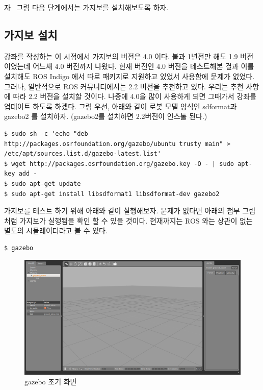 \noindent
자~ 그럼 다음 단계에서는 가지보를 설치해보도록 하자.

\subsection{가지보 설치}

강좌를 작성하는 이 시점에서 가지보의 버전은 4.0 이다. 불과 1년전만 해도 1.9 버전 이였는데 어느새 4.0 버전까지 나왔다. 현재 버전인 4.0 버전을 테스트해본 결과 이를 설치해도 ROS Indigo 에서 따로 패키지로 지원하고 있었서 사용함에 문제가 없었다. 그러나, 일반적으로 ROS 커뮤니티에서는 2.2 버전을 추천하고 있다. 우리는 추천 사항에 따라 2.2 버전을 설치할 것이다. 나중에 4.0을 많이 사용하게 되면 그때가서 강좌를 업데이트 하도록 하겠다. 그럼 우선, 아래와 같이 로봇 모델 양식인 sdformat과 gazebo2 를 설치하자. (gazebo2를 설치하면 2.2버전이 인스톨 된다.)

\vspace{\baselineskip}
\begin{lstlisting}[language=ROS]
$ sudo sh -c 'echo "deb http://packages.osrfoundation.org/gazebo/ubuntu trusty main" > /etc/apt/sources.list.d/gazebo-latest.list'
$ wget http://packages.osrfoundation.org/gazebo.key -O - | sudo apt-key add -
$ sudo apt-get update
$ sudo apt-get install libsdformat1 libsdformat-dev gazebo2 
\end{lstlisting}

가지보를 테스트 하기 위해 아래와 같이 실행해보자. 문제가 없다면 아래의 첨부 그림처럼 가지보가 실행됨을 확인 할 수 있을 것이다. 현재까지는 ROS 와는 상관이 없는 별도의 시뮬레이터라고 볼 수 있다.

\vspace{\baselineskip}
\begin{lstlisting}[language=ROS]
$ gazebo
\end{lstlisting}

\begin{figure}[h]
\centering\includegraphics[width=0.9\columnwidth]{pictures/chapter10/gazebo3d.png}
\caption{gazebo 초기 화면}
\end{figure}

